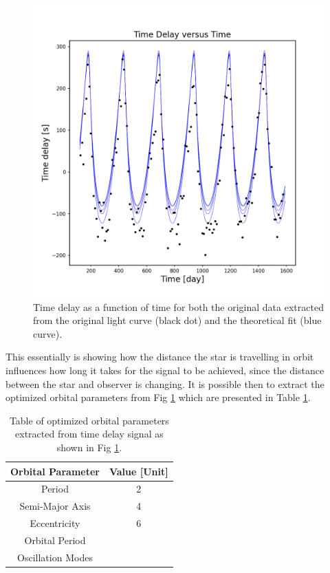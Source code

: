 \documentclass[]{article}
\begin{document}
\begin{figure}[H]
    \centering
    \includegraphics[width=1\linewidth]{time_delay.png}
    \caption{Time delay as a function of time for both the original data extracted from the original light curve (black dot) and the theoretical fit (blue curve).}
    \label{fig:timedelay}
\end{figure}
This essentially is showing how the distance the star is travelling in orbit influences how long it takes for the signal to be achieved, since the distance between the star and observer is changing. It is possible then to extract the optimized orbital parameters from Fig \ref{fig:timedelay} which are presented in Table \ref{tab: OptParam}.
\begin{table}[htp] 
\centering
\caption{Table of optimized orbital parameters extracted from time delay signal as shown in Fig \ref{fig:timedelay}.}
\setlength{\extrarowheight}{2pt}
\begin{tabular}{c | c}
Orbital Parameter & Value [Unit]\\
\hline
    Period  & 2  \\
    Semi-Major Axis & 4\\
    Eccentricity & 6\\
    Orbital Period & \\
    Oscillation Modes & \\
\end{tabular} 
\label{tab: OptParam}
\end{table}
\end{document}
